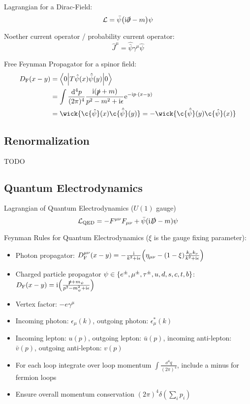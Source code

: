 			\noindent
			Lagrangian for a Dirac-Field:
			\begin{equation}
				\mathcal{L} = \bar{\psi} \qty(\mathrm{i} \slashed{\partial} - m) \psi
			\end{equation}
			
			\noindent
			Noether current operator / probability current operator:
			\begin{equation}
				\hat{J}^\mu = \hat{\bar{\psi}} \gamma^\mu \hat{\psi}
			\end{equation}

			\noindent
			Free Feynman Propagator for a spinor field:
			\begin{equation}
				\begin{aligned}
					D_\text{F}(x-y) &= \mel**{0}{T\hat{\psi}(x)\hat{\bar\psi}(y)}{0} \\
					&= \int \frac{\dd^4 p}{(2\pi)^4} \frac{\i(\slashed{p}+m)}{p^2-m^2+\i\epsilon} \ex^{-\i p\cdot(x-y)} \\
					&= \wick{\c{\hat{\psi}}(x) \c{\hat{\bar{\psi}}}(y)} = - \wick{\c{\hat{\bar{\psi}}}(y) \c{\hat\psi}(x)}
				\end{aligned}
			\end{equation}
			
	\subsection{Renormalization}
		TODO

	\subsection{Quantum Electrodynamics}
		Lagrangian of Quantum Electrodynamics ($U(1)$ gauge)
		\begin{equation}
			\mathcal{L}_\mathrm{QED} = -F^{\mu\nu}F_{\mu\nu} + \bar{\psi}(\mathrm{i}\slashed{D}-m)\psi		
		\end{equation}

		\noindent
		Feynman Rules for Quantum Electrodynamics ($\xi$ is the gauge fixing parameter):
		\begin{itemize}\itemsep -0pt
			\item Photon propagator: $D_\text{F}^{\mu\nu}(x-y) = -\frac{\mathrm{i}}{k^2+\mathrm{i}\epsilon} \qty(\eta_{\mu\nu}-(1-\xi)\frac{k_\mu k_\nu}{k^2+\mathrm{i}\epsilon} )$
			\item Charged particle propagator $\psi \in \qty{e^\pm, \mu^\pm ,\tau^\pm, u,d,s,c,t,b}$: $D_\text{F}(x-y) = \mathrm{i}\qty(\frac{\slashed{p}+m_\psi}{p^2-m_\psi^2+\mathrm{i}\epsilon})$
			\item Vertex factor: $-e\gamma^\mu$
			\item Incoming photon: $\epsilon_\mu(k)$, outgoing photon: $\epsilon^{*}_\mu(k)$
			\item Incoming lepton: $u(p)$, outgoing lepton: $\bar{u}(p)$, incoming anti-lepton: $\bar{v}(p)$, outgoing anti-lepton: $v(p)$
			\item For each loop integrate over loop momentum $\int \frac{\dd^4 q}{(2\pi)^4}$, include a minus for fermion loops
			\item Ensure overall momentum conservation $(2\pi)^4 \delta(\sum_i p_i)$
		\end{itemize}

